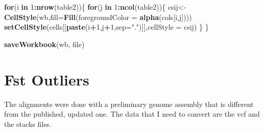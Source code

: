 \documentclass[11pt,]{article}
\newenvironment{Shaded}{\begin{snugshade}}{\end{snugshade}}
\newcommand{\KeywordTok}[1]{\textcolor[rgb]{0.13,0.29,0.53}{\textbf{#1}}}
\newcommand{\DataTypeTok}[1]{\textcolor[rgb]{0.13,0.29,0.53}{#1}}
\newcommand{\DecValTok}[1]{\textcolor[rgb]{0.00,0.00,0.81}{#1}}
\newcommand{\StringTok}[1]{\textcolor[rgb]{0.31,0.60,0.02}{#1}}
\newcommand{\ControlFlowTok}[1]{\textcolor[rgb]{0.13,0.29,0.53}{\textbf{#1}}}
\newcommand{\OperatorTok}[1]{\textcolor[rgb]{0.81,0.36,0.00}{\textbf{#1}}}
\newcommand{\NormalTok}[1]{#1}
\begin{document}
\begin{Shaded}
\begin{Highlighting}[]
\ControlFlowTok{for}\NormalTok{(i }\ControlFlowTok{in} \DecValTok{1}\OperatorTok{:}\KeywordTok{nrow}\NormalTok{(table2))\{}
  \ControlFlowTok{for}\NormalTok{(j }\ControlFlowTok{in} \DecValTok{1}\OperatorTok{:}\KeywordTok{ncol}\NormalTok{(table2))\{}
\NormalTok{    csij<-}\KeywordTok{CellStyle}\NormalTok{(wb,}\DataTypeTok{fill=}\KeywordTok{Fill}\NormalTok{(}\DataTypeTok{foregroundColor =} \KeywordTok{alpha}\NormalTok{(cols[i,j])))}
    \KeywordTok{setCellStyle}\NormalTok{(cells[[}\KeywordTok{paste}\NormalTok{(i}\OperatorTok{+}\DecValTok{1}\NormalTok{,j}\OperatorTok{+}\DecValTok{1}\NormalTok{,}\DataTypeTok{sep=}\StringTok{"."}\NormalTok{)]],}\DataTypeTok{cellStyle =}\NormalTok{ csij)}
\NormalTok{  \}}
\NormalTok{\}}

\KeywordTok{saveWorkbook}\NormalTok{(wb, file)}
\end{Highlighting}
\end{Shaded}

\section*{Fst Outliers}\label{fst-outliers}

The alignments were done with a preliminary genome assembly that is
different from the published, updated one. The data that I need to
convert are the vcf and the stacks files.
\end{document}

